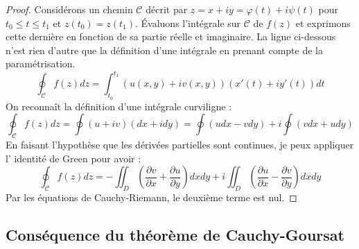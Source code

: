 \begin{proof}
	Considérons un chemin $\mathcal{C}$ décrit par $z = x+iy = \varphi(t) + i\psi(t)$ pour
	$t_0 \leq t \leq t_1$ et $z(t_0) = z(t_1)$. Évaluons l'intégrale sur $\mathcal{C}$ de
	$f(z)$ et exprimons cette dernière en fonction de sa partie réelle et imaginaire. La 
	ligne ci-dessous n'est rien d'autre que la définition d'une intégrale en prenant compte
	de la paramétrisation.
	\begin{equation}
		\oint_\mathcal{C}f(z) dz = \int_{t_0}^{t_1} (u(x,y) + iv(x,y))(x'(t) + iy'(t)) dt
	\end{equation}
	On reconnaît la définition d'une intégrale curviligne :
	\begin{equation}
		\oint_\mathcal{C}f(z) dz = \oint (u+iv)(dx+idy) = \oint(udx - vdy) + i\oint (vdx + udy)
	\end{equation}
	En faisant l'hypothèse que les dérivées partielles sont continues, je peux appliquer l'
	identité de Green pour avoir :
	\begin{equation}
		\oint_\mathcal{C}f(z) dz = -\iint_D \left(\dfrac{\partial v}{\partial x} + 
		\dfrac{\partial u}{\partial y}\right) dxdy + i\iint_D\left(
		\dfrac{\partial u}{\partial x} - \dfrac{\partial v}{\partial y}\right)dxdy
	\end{equation}
	Par les équations de Cauchy-Riemann, le deuxième terme est nul.
\end{proof}


\subsection{Conséquence du théorème de Cauchy-Goursat}
